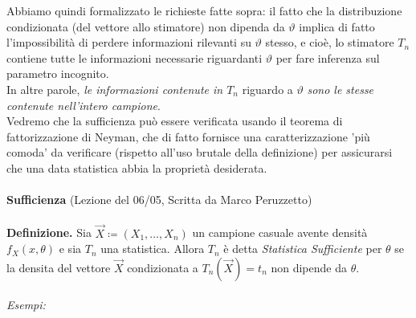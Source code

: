 Abbiamo quindi formalizzato le richieste fatte sopra: il fatto che la distribuzione condizionata (del vettore allo stimatore) non dipenda da $\vartheta$ implica di fatto l'impossibilità di perdere informazioni rilevanti su $\vartheta$ stesso, e cioè, lo stimatore $T_n$ contiene tutte le informazioni necessarie riguardanti $\vartheta$ per fare inferenza sul parametro incognito.\\
In altre parole, \textit{le informazioni contenute in $T_n$} riguardo a $\vartheta$ \textit{sono le stesse contenute nell'intero campione}.\\
Vedremo che la sufficienza può essere verificata usando il teorema di fattorizzazione di Neyman, che di fatto fornisce una caratterizzazione 'più comoda' da verificare (rispetto all'uso brutale della definizione) per assicurarsi che una data statistica abbia la proprietà desiderata.\\
\\
\noindent\textbf{Sufficienza} (Lezione del 06/05, Scritta da Marco Peruzzetto)\\
\\
\textbf{Definizione.} Sia $\vec{X}\coloneqq (X_1,\ldots,X_n)$ un campione casuale avente densità $f_X(x,\theta)$ e sia $T_n$ una statistica. Allora $T_n$ è detta \textit{Statistica Sufficiente} per $\theta$ se la densita del vettore $\vec{X}$ condizionata a $T_n(\vec{X})=t_n$ non dipende da $\theta.$
\\
\\
\textit{Esempi:} 


